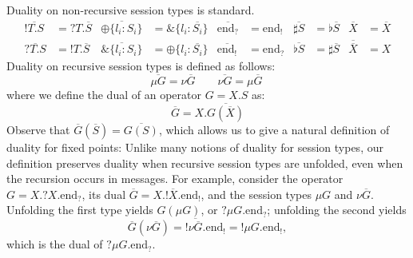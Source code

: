 \documentclass[orivec,envcountsame]{llncs}
\newcommand{\with}{\mathbin\binampersand}
\newcommand{\gvdual}[1]{\overline{#1}}
\newcommand{\gvout}[2]{{!#1.#2}}
\newcommand{\gvin}[2]{{?#1.#2}}
\newcommand{\outterm}{\mathrm{end}_!}
\newcommand{\interm}{\mathrm{end}_?}
\newcommand{\gvserver}[1]{\flat #1}
\newcommand{\gvservice}[1]{\sharp #1}
\begin{document}
Duality on non-recursive session types is standard.
\begin{align*}
\gvdual{\gvout{T}{S}} &= \gvin{T}{\gvdual{S}} &
  \gvdual{\oplus \{ l_i: S_i \}} &= \with \{ l_i : \gvdual{S_i} \} &
  \gvdual{\interm} &= \outterm &
  \gvdual{\gvservice{S}} &= \gvserver{\gvdual{S}} &
  \gvdual{X} &= \gvdual{X} \\
\gvdual{\gvin{T}{S}} &= \gvout{T}{\gvdual{S}} &
  \gvdual{\with \{ l_i: S_i \}} &= \oplus \{ l_i : \gvdual{S_i} \} &
  \gvdual{\outterm} &= \interm &
  \gvdual{\gvserver{S}} &= \gvservice{\gvdual{S}} &
  \gvdual{\gvdual{X}} &= X
\end{align*}%
Duality on recursive session types is defined as follows:
\[
\gvdual{\mu G} = \nu \gvdual{G} \qquad \gvdual{\nu G} = \mu \gvdual{G} \
\]%
where we define the dual of an operator $G = X.S$ as:
\[
\gvdual{G} = X.\gvdual{G(\gvdual{X})}
\]%
%
Observe that $\gvdual{G}(\gvdual{S}) = \gvdual{G(S)}$, which allows us to
give a natural definition of duality for fixed points:
%
Unlike many notions of duality for session types, our definition preserves duality when recursive
session types are unfolded, even when the recursion occurs in messages.  For example, consider the
operator $G = X.\gvin{X}{\interm}$, its dual $\gvdual{G} = X.\gvout{\gvdual{X}}{\outterm}$, and the
session types $\mu G$ and $\nu \gvdual{G}$.  Unfolding the first type yields $G(\mu G)$, or
$\gvin{\mu G}{\interm}$; unfolding the second yields
\[
  \gvdual{G}(\nu \gvdual{G}) = \gvout{\gvdual{\nu \gvdual{G}}}{\outterm} = \gvout{\mu G}{\outterm},
\]
which is the dual of $\gvin{\mu G}{\interm}$.
\end{document}
